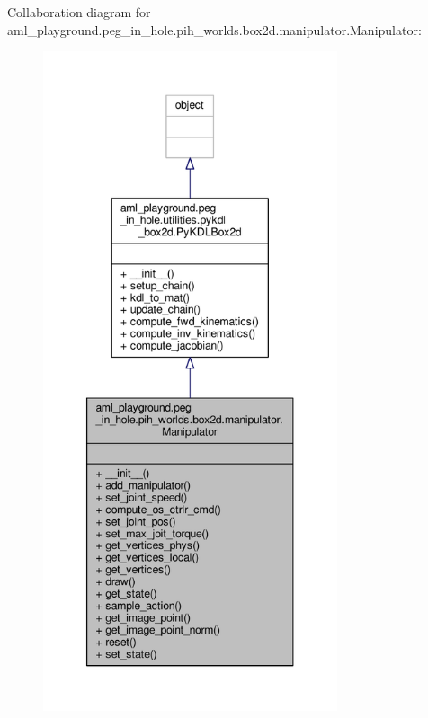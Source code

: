 Collaboration diagram for aml\-\_\-playground.\-peg\-\_\-in\-\_\-hole.\-pih\-\_\-worlds.\-box2d.\-manipulator.\-Manipulator\-:
\nopagebreak
\begin{figure}[H]
\begin{center}
\leavevmode
\includegraphics[height=550pt]{classaml__playground_1_1peg__in__hole_1_1pih__worlds_1_1box2d_1_1manipulator_1_1_manipulator__coll__graph}
\end{center}
\end{figure}
